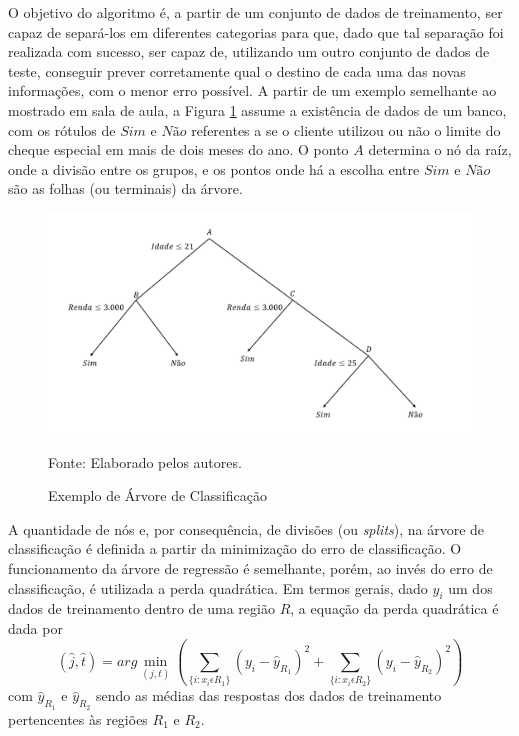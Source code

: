 \documentclass[a4paper,12pt]{article}[abntex2]
\begin{document}
O objetivo do algoritmo é, a partir de um conjunto de dados de treinamento, ser capaz de separá-los em diferentes categorias para que, dado que tal separação foi realizada com sucesso, ser capaz de, utilizando um outro conjunto de dados de teste, conseguir prever corretamente qual o destino de cada uma das novas informações, com o menor erro possível. A partir de um exemplo semelhante ao mostrado em sala de aula, a Figura \ref{fig1 - 1} assume a existência de dados de um banco, com os rótulos de \(Sim\) e \(Não\) referentes a se o cliente utilizou ou não o limite do cheque especial em mais de dois meses do ano. O ponto \(A\) determina o nó da raíz, onde a divisão entre os grupos, e os pontos onde há a escolha entre \(Sim\) e \(Não\)  são as folhas (ou terminais) da árvore.

\begin{figure}[H]
    \centering
    \caption{Exemplo de Árvore de Classificação} 
    \includegraphics[width=1.0\textwidth]{APS/fig1 - 1.png}
    \label{fig1 - 1}
    
    \footnotesize{Fonte: Elaborado pelos autores.}
\end{figure}

A quantidade de nós e, por consequência, de divisões (ou \textit{splits}), na árvore de classificação é definida a partir da minimização do erro de classificação. O funcionamento da árvore de regressão é semelhante, porém, ao invés do erro de classificação, é utilizada a perda quadrática. Em termos gerais, dado \(y_i\) um dos dados de treinamento dentro de uma região \(R\), a equação da perda quadrática é dada por
\begin{equation}
    (\hat{j}, \hat{t}) = arg \min_{(j,t)} \left(\sum_{\{i: x_i \epsilon R_1\}}(y_i - \hat{y}_{R_1})^2 + \sum_{\{i: x_i \epsilon R_2\}}(y_i - \hat{y}_{R_2})^2 \right)
\end{equation}
com \(\hat{y}_{R_1}\) e \(\hat{y}_{R_2}\) sendo as médias das respostas dos dados de treinamento pertencentes às regiões \(R_1\) e \(R_2\).
\end{document}
